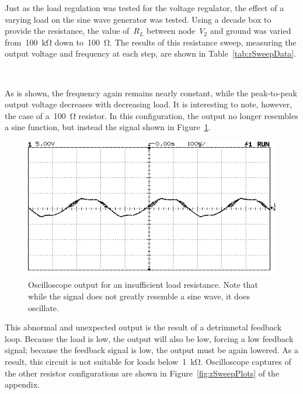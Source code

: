Just as the load regulation was tested for the voltage regulator, the effect of
a varying load on the sine wave generator was tested.  Using a decade box to
provide the resistance, the value of~$R_L$ between node~$V_2$ and ground was
varied from~\SI{100}{\kilo\ohm} down to~\SI{100}{\ohm}.  The results of this
resistance sweep, measuring the output voltage and frequency at each step, are
shown in Table~\ref{tab:rSweepData}.
%
\begin{table}[H]
	\centering
	\\
	\parbox[Resistance Sweep Data]{.6\textwidth}{
	\caption{Measured values from the load regulation tests.  Note that at a
	load of~\SI{100}{\ohm}, a sine wave is not actually produced, but the
	output does oscillate.}
	\label{tab:rSweepData}
	}
\end{table}
%
As is shown, the frequency again remains nearly constant, while the
peak-to-peak output voltage decreases with decreasing load.  It is interesting
to note, however, the case of a~\SI{100}{\ohm} resistor.  In this
configuration, the output no longer resembles a sine function, but instead the
signal shown in Figure~\ref{fig:lowLoad}.
%
\begin{figure}[H]
	\centering
	\includegraphics[width=.6\textwidth]{img/shot/pt5_100Shot.png}
	\parbox{.6\textwidth}{
	\caption[Oscilloscope Screenshot --- Insufficient Load]{Oscilloscope output
	for an insufficient load resistance.  Note that while the signal does not
	greatly resemble a sine wave, it does oscillate.}
	\label{fig:lowLoad}
	}
\end{figure}
%
This abnormal and unexpected output is the result of a detrimnetal feedback
loop.  Because the load is low, the output will also be low, forcing a low
feedback signal; because the feedback signal is low, the output must be again
lowered.  As a result, this circuit is not suitable for loads
below~\SI{1}{\kilo\ohm}.  Oscilloscope captures of the other resistor
configurations are shown in Figure~\ref{fig:rSweepPlots} of the appendix.
